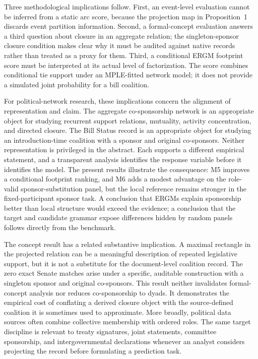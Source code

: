 \documentclass{nws}
\begin{document}
Three methodological implications follow. First, an event-level evaluation cannot be inferred from a static arc score, because the projection map in Proposition~1 discards event partition information. Second, a formal-concept evaluation answers a third question about closure in an aggregate relation; the singleton-sponsor closure condition makes clear why it must be audited against native records rather than treated as a proxy for them. Third, a conditional ERGM footprint score must be interpreted at its actual level of factorization. The score combines conditional tie support under an MPLE-fitted network model; it does not provide a simulated joint probability for a bill coalition.

For political-network research, these implications concern the alignment of representation and claim. The aggregate co-sponsorship network is an appropriate object for studying recurrent support relations, mutuality, activity concentration, and directed closure. The Bill Status record is an appropriate object for studying an introduction-time coalition with a sponsor and original co-sponsors. Neither representation is privileged in the abstract. Each supports a different empirical statement, and a transparent analysis identifies the response variable before it identifies the model. The present results illustrate the consequence: M5 improves a conditional footprint ranking, and M6 adds a modest advantage on the role-valid sponsor-substitution panel, but the local reference remains stronger in the fixed-participant sponsor task. A conclusion that ERGMs explain sponsorship better than local structure would exceed the evidence; a conclusion that the target and candidate grammar expose differences hidden by random panels follows directly from the benchmark.

The concept result has a related substantive implication. A maximal rectangle in the projected relation can be a meaningful description of repeated legislative support, but it is not a substitute for the document-level coalition record. The zero exact Senate matches arise under a specific, auditable construction with a singleton sponsor and original co-sponsors. This result neither invalidates formal-concept analysis nor reduces co-sponsorship to dyads. It demonstrates the empirical cost of conflating a derived closure object with the source-defined coalition it is sometimes used to approximate. More broadly, political data sources often combine collective membership with ordered roles. The same target discipline is relevant to treaty signatures, joint statements, committee sponsorship, and intergovernmental declarations whenever an analyst considers projecting the record before formulating a prediction task.
\end{document}
